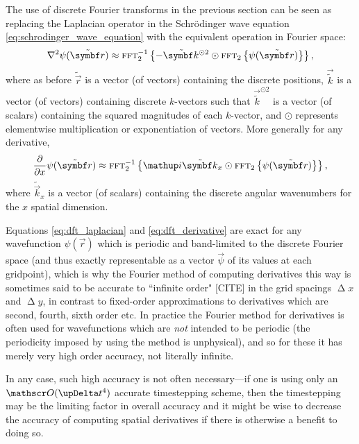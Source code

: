 The use of discrete Fourier transforms in the previous section can be seen as replacing the Laplacian operator in the Schr\"odinger wave equation \eqref{eq:schrodinger_wave_equation} with the equivalent operation in Fourier space:
\begin{align}\label{eq:dft_laplacian}
\nabla^2\psi(\tilde{\vec r}) \approx \fft_2^{-1}\left\{-\tilde{\vec k}^{\odot 2} \odot \fft_2\left\{\psi(\tilde{\vec r})\right\}\right\},
\end{align}
where as before $\tilde{\vec r}$ is a vector (of vectors) containing the discrete positions, $\vec{\tilde k}$ is a vector (of vectors) containing discrete $k$-vectors such that $\vec{\tilde k}^{\odot 2}$ is a vector (of scalars) containing the squared magnitudes of each $k$-vector, and $\odot$ represents elementwise multiplication or exponentiation of vectors. More generally for any derivative,
\begin{align}\label{eq:dft_derivative}
\pdv{x}\psi(\tilde{\vec r}) \approx \fft_2^{-1}\left\{\ii\tilde{\vec k}_x \odot \fft_2\left\{\psi(\tilde{\vec r})\right\}\right\},
\end{align}
where $\tilde{\vec k}_x$ is a vector (of scalars) containing the discrete angular wavenumbers for the $x$ spatial dimension.

Equations \eqref{eq:dft_laplacian} and \eqref{eq:dft_derivative} are exact for any wavefunction $\psi(\vec r)$ which is periodic and band-limited to the discrete Fourier space (and thus exactly representable as a vector $\vec \psi$ of its values at each gridpoint), which is why the Fourier method of computing derivatives this way is sometimes said to be accurate to ``infinite order" [CITE] in the grid spacings $\upDelta x$ and $\upDelta y$, in contrast to fixed-order approximations to derivatives which are second, fourth, sixth order etc. In practice the Fourier method for derivatives is often used for wavefunctions which are \emph{not} intended to be periodic (the periodicity imposed by using the method is unphysical), and so for these it has merely very high order accuracy, not literally infinite. 

In any case, such high accuracy is not often necessary---if one is using only an $\Ord{\upDelta t^4}$ accurate timestepping scheme, then the timestepping may be the limiting factor in overall accuracy and it might be wise to decrease the accuracy of computing spatial derivatives if there is otherwise a benefit to doing so.

